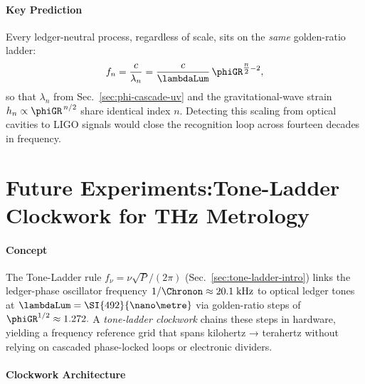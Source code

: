 \documentclass[11pt,oneside]{book}
\begin{document}
{\paragraph*{Key Prediction}

Every ledger-neutral process, regardless of scale, sits on the
\emph{same} golden-ratio ladder:
\[
   f_{n}
   =
   \frac{c}{\lambda_{n}}
   =
   \frac{c}{\lambdaLum}\,\phiGR^{\tfrac{n}{2}-2},
\]
so that \(\lambda_{n}\) from
Sec.~\ref{sec:phi-cascade-uv} 
and the gravitational-wave strain
\(h_{n}\propto\phiGR^{\,n/2}\)
share identical index $n$.
Detecting this scaling from optical cavities to LIGO signals would
close the recognition loop across fourteen decades in frequency.


\section{Future Experiments:\;Tone-Ladder Clockwork for THz Metrology}
\label{sec:thz-clockwork}

\paragraph{Concept}

The Tone-Ladder rule
\(
   f_{\nu}=\nu\sqrt{P}/(2\pi)
   \)
(Sec.~\ref{sec:tone-ladder-intro}) links the ledger-phase oscillator
frequency
\(1/\Chronon\approx20.1\;\text{kHz}\)
to optical ledger tones at
\(\lambdaLum=\SI{492}{\nano\metre}\)
via golden-ratio steps of
\(\phiGR^{1/2}\approx1.272.
\)
A \emph{tone-ladder clockwork} chains these steps in hardware,
yielding a frequency reference grid that spans kilohertz → terahertz
without relying on cascaded phase-locked loops or electronic dividers.

\paragraph{Clockwork Architecture}

}
\end{document}
